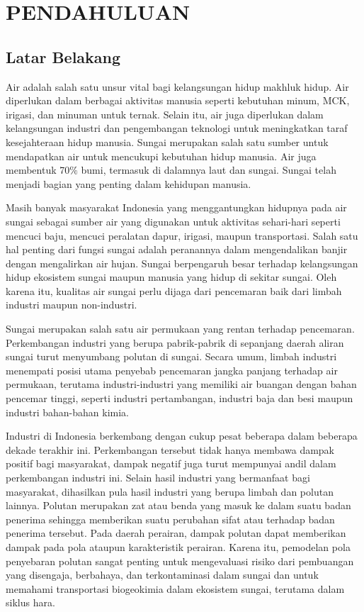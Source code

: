 \chapter{PENDAHULUAN}

\section{Latar Belakang}
Air adalah salah satu unsur vital bagi kelangsungan hidup makhluk hidup. Air diperlukan dalam berbagai aktivitas manusia seperti kebutuhan minum, MCK, irigasi, dan minuman untuk ternak. Selain itu, air juga diperlukan dalam kelangsungan industri dan pengembangan teknologi untuk meningkatkan taraf kesejahteraan hidup manusia. Sungai merupakan salah satu sumber untuk mendapatkan air untuk mencukupi kebutuhan hidup manusia. Air juga membentuk 70$\%$ bumi, termasuk di dalamnya laut dan sungai. Sungai telah menjadi bagian yang penting dalam kehidupan manusia.

Masih banyak masyarakat Indonesia yang menggantungkan hidupnya pada air sungai sebagai sumber air yang digunakan untuk aktivitas sehari-hari seperti mencuci baju, mencuci peralatan dapur, irigasi, maupun transportasi. Salah satu hal penting dari fungsi sungai adalah peranannya dalam mengendalikan banjir dengan mengalirkan air hujan. Sungai berpengaruh besar terhadap kelangsungan hidup ekosistem sungai maupun manusia yang hidup di sekitar sungai. Oleh karena itu, kualitas air sungai perlu dijaga dari pencemaran baik dari limbah industri maupun non-industri.

Sungai merupakan salah satu air permukaan yang rentan terhadap pencemaran. Perkembangan industri yang berupa pabrik-pabrik di sepanjang daerah aliran sungai turut menyumbang polutan di sungai. Secara umum, limbah industri menempati posisi utama penyebab pencemaran jangka panjang terhadap air permukaan, terutama industri-industri yang memiliki air buangan dengan bahan pencemar tinggi, seperti industri pertambangan, industri baja dan besi maupun industri bahan-bahan kimia.

Industri di Indonesia berkembang dengan cukup pesat beberapa dalam beberapa dekade terakhir ini. Perkembangan tersebut tidak hanya membawa dampak positif bagi masyarakat, dampak negatif juga turut mempunyai andil dalam perkembangan industri ini. Selain hasil industri yang bermanfaat bagi masyarakat, dihasilkan pula hasil industri yang berupa limbah dan polutan lainnya. Polutan merupakan zat atau benda yang masuk ke dalam suatu badan penerima sehingga memberikan suatu perubahan sifat atau terhadap badan penerima tersebut. Pada daerah perairan, dampak polutan dapat memberikan dampak pada pola ataupun karakteristik perairan. Karena itu, pemodelan pola penyebaran polutan sangat penting untuk mengevaluasi risiko dari pembuangan yang disengaja, berbahaya, dan terkontaminasi dalam sungai dan untuk memahami transportasi biogeokimia dalam ekosistem sungai, terutama dalam siklus hara.

